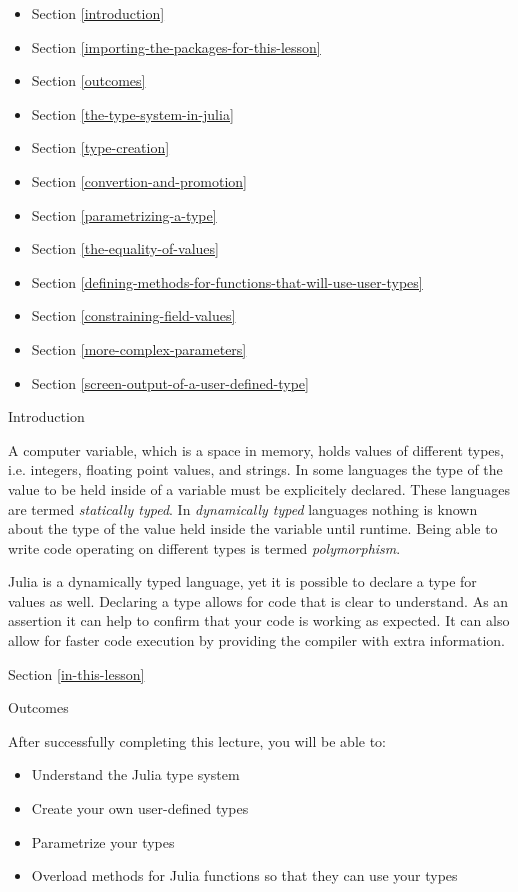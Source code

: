 \documentclass[11pt]{article}
\providecommand{\tightlist}{%
      \setlength{\itemsep}{0pt}\setlength{\parskip}{0pt}}
\begin{document}
    \begin{itemize}
\tightlist
\item
  Section \ref{introduction}
\item
  Section \ref{importing-the-packages-for-this-lesson}
\item
  Section \ref{outcomes}
\item
  Section \ref{the-type-system-in-julia}
\item
  Section \ref{type-creation}
\item
  Section \ref{convertion-and-promotion}
\item
  Section \ref{parametrizing-a-type}
\item
  Section \ref{the-equality-of-values}
\item
  Section \ref{defining-methods-for-functions-that-will-use-user-types}
\item
  Section \ref{constraining-field-values}
\item
  Section \ref{more-complex-parameters}
\item
  Section \ref{screen-output-of-a-user-defined-type}
\end{itemize}

    Introduction

    A computer variable, which is a space in memory, holds values of
different types, i.e. integers, floating point values, and strings. In
some languages the type of the value to be held inside of a variable
must be explicitely declared. These languages are termed
\emph{statically typed}. In \emph{dynamically typed} languages nothing
is known about the type of the value held inside the variable until
runtime. Being able to write code operating on different types is termed
\emph{polymorphism}.

    Julia is a dynamically typed language, yet it is possible to declare a
type for values as well. Declaring a type allows for code that is clear
to understand. As an assertion it can help to confirm that your code is
working as expected. It can also allow for faster code execution by
providing the compiler with extra information.

    Section \ref{in-this-lesson}

    Outcomes

    After successfully completing this lecture, you will be able to:

\begin{itemize}
\tightlist
\item
  Understand the Julia type system
\item
  Create your own user-defined types
\item
  Parametrize your types
\item
  Overload methods for Julia functions so that they can use your types
\end{itemize}
\end{document}
